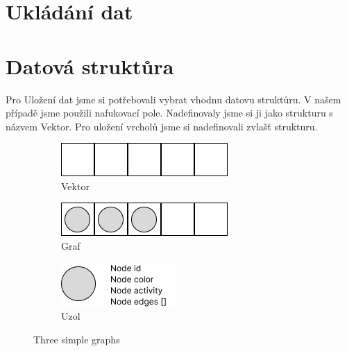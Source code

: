 \section{Ukládání dat}

\section{Datová struktůra}

Pro Uložení dat jsme si potřebovali vybrat vhodnu datovu struktůru. V našem případě jsme použili nafukovací pole.
Nadefinovaly jsme si ji jako strukturu s názvem Vektor. Pro uložení vrcholů jsme si nadefinovali zvlašť strukturu.

\begin{figure}[h]
    \centering
    \begin{subfigure}[b]{0.3\textwidth}
        \centering
        \includegraphics[width=\textwidth]{doc/fig/vector.png}
        \caption{Vektor}
        \label{fig:vector}
    \end{subfigure}
    \hfill
    \begin{subfigure}[b]{0.3\textwidth}
        \centering
        \includegraphics[width=\textwidth]{doc/fig/graph.png}
        \caption{Graf}
        \label{fig:graph}
    \end{subfigure}
    \hfill
    \begin{subfigure}[b]{0.3\textwidth}
        \centering
        \includegraphics[width=\textwidth]{doc/fig/node.png}
        \caption{Uzol}
        \label{fig:five over x}
    \end{subfigure}
    \caption{Three simple graphs}
    \label{fig:three graphs}
\end{figure}


